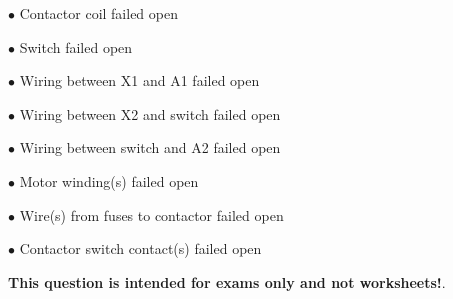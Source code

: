 \medskip
\item{$\bullet$} Contactor coil failed open
\item{$\bullet$} Switch failed open
\item{$\bullet$} Wiring between X1 and A1 failed open
\item{$\bullet$} Wiring between X2 and switch failed open
\item{$\bullet$} Wiring between switch and A2 failed open
\item{$\bullet$} Motor winding(s) failed open
\item{$\bullet$} Wire(s) from fuses to contactor failed open
\item{$\bullet$} Contactor switch contact(s) failed open
\medskip







{\bf This question is intended for exams only and not worksheets!}.



